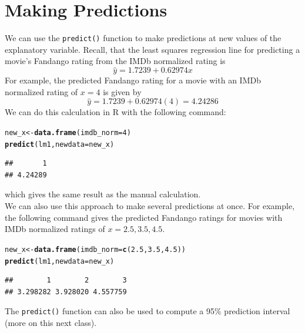 \documentclass[11pt]{article}\usepackage[]{graphicx}\usepackage[]{color}
\makeatletter
\newcommand{\hlnum}[1]{\textcolor[rgb]{0.686,0.059,0.569}{#1}}%
\newcommand{\hlstd}[1]{\textcolor[rgb]{0.345,0.345,0.345}{#1}}%
\newcommand{\hlkwb}[1]{\textcolor[rgb]{0.69,0.353,0.396}{#1}}%
\newcommand{\hlkwc}[1]{\textcolor[rgb]{0.333,0.667,0.333}{#1}}%
\newcommand{\hlkwd}[1]{\textcolor[rgb]{0.737,0.353,0.396}{\textbf{#1}}}%
\newenvironment{kframe}{%
 \def\at@end@of@kframe{}%
 \ifinner\ifhmode%
  \def\at@end@of@kframe{\end{minipage}}%
  \begin{minipage}{\columnwidth}%
 \fi\fi%
 \def\FrameCommand##1{\hskip\@totalleftmargin \hskip-\fboxsep
 \colorbox{shadecolor}{##1}\hskip-\fboxsep
     \hskip-\linewidth \hskip-\@totalleftmargin \hskip\columnwidth}%
 \MakeFramed {\advance\hsize-\width
   \@totalleftmargin\z@ \linewidth\hsize
   \@setminipage}}%
 {\par\unskip\endMakeFramed%
 \at@end@of@kframe}
\newenvironment{knitrout}{}{} %
\makeatother
\begin{document}
\section{Making Predictions}
We can use the \texttt{predict()} function to make predictions at new values of the explanatory variable.  Recall, that the least squares regression line for predicting a movie's Fandango rating from the IMDb normalized rating is
$$\hat{y} =  1.7239 + 0.62974x$$
For example, the predicted Fandango rating for a movie with an IMDb normalized rating of $x=4$ is given by
$$\hat{y} =  1.7239 + 0.62974(4) = 4.24286$$
We can do this calculation in R with the following command:
\begin{knitrout}
\color{fgcolor}\begin{kframe}
\begin{alltt}
\hlstd{new_x} \hlkwb{<-} \hlkwd{data.frame}\hlstd{(}\hlkwc{imdb_norm} \hlstd{=} \hlnum{4}\hlstd{)}
\hlkwd{predict}\hlstd{(lm1,} \hlkwc{newdata} \hlstd{= new_x)}
\end{alltt}
\begin{verbatim}
##       1 
## 4.24289
\end{verbatim}
\end{kframe}
\end{knitrout}
which gives the same result as the manual calculation.\\

We can also use this approach to make several predictions at once.  For example, the following command gives the predicted Fandango ratings for movies with IMDb normalized ratings of $x=2.5, 3.5, 4.5$.
\begin{knitrout}
\color{fgcolor}\begin{kframe}
\begin{alltt}
\hlstd{new_x} \hlkwb{<-} \hlkwd{data.frame}\hlstd{(}\hlkwc{imdb_norm} \hlstd{=} \hlkwd{c}\hlstd{(}\hlnum{2.5}\hlstd{,}\hlnum{3.5}\hlstd{,}\hlnum{4.5}\hlstd{))}
\hlkwd{predict}\hlstd{(lm1,} \hlkwc{newdata} \hlstd{= new_x)}
\end{alltt}
\begin{verbatim}
##        1        2        3 
## 3.298282 3.928020 4.557759
\end{verbatim}
\end{kframe}
\end{knitrout}

The \texttt{predict()} function can also be used to compute a 95\% prediction interval (more on this next class).
\end{document}
